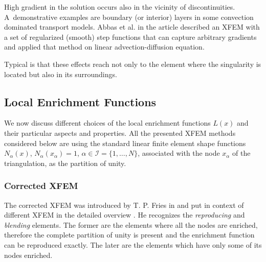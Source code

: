 High gradient in the solution occurs also in the vicinity of discontinuities. A~demonstrative examples are boundary (or interior) layers
in some convection dominated transport models. Abbas et al. in the article \cite{abbas_alizada_fries_highgradient_2010} described an XFEM with
a set of regularized (smooth) step functions that can capture arbitrary gradients and applied that method on linear advection-diffusion equation.

Typical is that these effects reach not only to the element where the singularity is located but also in its surroundings.





 
\subsection{Local Enrichment Functions}
We now discuss different choices of the local enrichment functions $L(x)$ and their particular aspects and properties.
All the presented XFEM methods considered below are using the standard linear finite element shape 
functions $N_\alpha(x)$, $N_\alpha(x_\alpha)=1$, $\alpha\in\mathcal{I}=\{1,\ldots,N\}$, associated with the node $x_\alpha$ of the triangulation,
as the partition of unity.

\subsubsection{Corrected XFEM}
The corrected XFEM was introduced by T. P. Fries in \cite{fries_corrected_2008} and put in context of different XFEM in the detailed overview \cite{fries_xfem_overview_2010}.
He recognizes the \emph{reproducing} and \emph{blending} elements.
The former are the elements where all the nodes are enriched, therefore the complete partition of unity is present
and the enrichment function can be reproduced exactly. The later are the elements which have only some of its nodes enriched.

